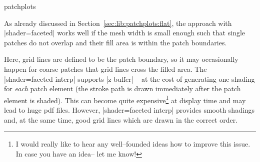 \begin{pgfplotslibrary}{patchplots}
\begin{codeexample}[]
\end{codeexample}
\noindent As already discussed in Section~\ref{sec:lib:patchplots:flat}, the approach with |shader=faceted| works well if the mesh width is small enough such that single patches do not overlap and their fill area is within the patch boundaries.
%
\begin{codeexample}[]
\end{codeexample}
\noindent Here, grid lines are defined to be the patch boundary, so it may occasionally happen for coarse patches that grid lines cross the filled area. The |shader=faceted interp| supports |z buffer| -- at the cost of generating one shading for \emph{each} patch element (the stroke path is drawn immediately after the patch element is shaded). This can become quite expensive\footnote{I would really like to hear any well--founded ideas how to improve this issue. In case you have an idea-- let me know!} at display time and may lead to huge pdf files. However, |shader=faceted interp| provides smooth shadings and, at the same time, good  grid lines which are drawn in the correct order. 

%
\begin{codeexample}[]
\begin{tikzpicture}
\begin{axis}[
	title={Mesh on top of patches (i): obscured}]


\end{axis}
\end{tikzpicture}
\end{codeexample}
\end{pgfplotslibrary}
